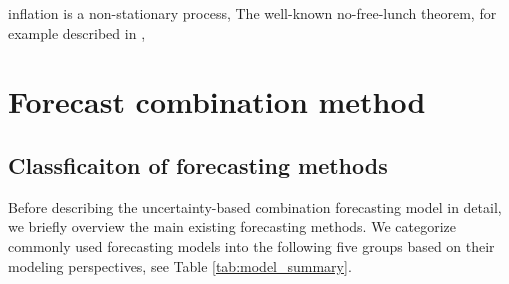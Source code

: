 \documentclass[12pt]{article}
\begin{document}
inflation is a non-stationary process,
The well-known no-free-lunch theorem, for example described in \cite{wolpert1996lack},
\section{Forecast combination method}
\paragraph{}

\subsection{Classficaiton of forecasting methods}

Before describing the uncertainty-based combination forecasting model in detail, we briefly overview the main existing forecasting methods. We categorize commonly used forecasting models into the following five groups based on their modeling perspectives, see Table \ref{tab:model_summary}. 
\end{document}
